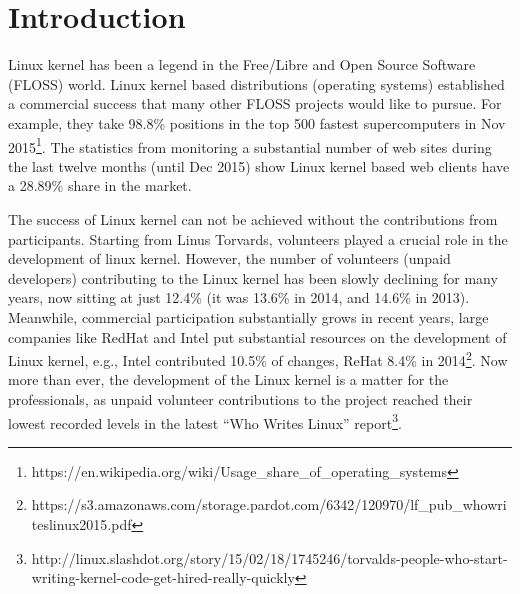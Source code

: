 \documentclass{sig-alternate-05-2015}
\begin{document}
\section{Introduction}

% 

Linux kernel has been a legend in the Free/Libre and Open Source Software (FLOSS) world.
Linux kernel based distributions (operating systems) established a commercial success
that many other FLOSS projects would like to pursue.
For example, they take 98.8\% positions in the top 500 fastest supercomputers 
in Nov 2015\footnote{https://en.wikipedia.org/wiki/Usage\_share\_of\_operating\_systems}.
The statistics from monitoring a substantial number of web sites during the 
last twelve months (until Dec 2015) show Linux kernel based
web clients have a 28.89\% share in the market.

The success of Linux kernel can not be achieved without the contributions
from participants. Starting from Linus Torvards,  volunteers
played a crucial role in the development of linux kernel. 
However, the number of volunteers (unpaid developers) contributing to the 
Linux kernel has been slowly declining for many years, now sitting at just 
 12.4\% (it was 13.6\% in 2014, and 14.6\% in 2013).
Meanwhile, commercial participation substantially grows in recent years,
large companies like RedHat and Intel put substantial resources on the development
of Linux kernel, e.g., Intel contributed 10.5\% of changes, ReHat 8.4\% 
in 2014\footnote{https://s3.amazonaws.com/storage.pardot.com/6342/120970/lf\_pub\_whowriteslinux2015.pdf}.
Now more than ever, the development of the Linux kernel is a matter for 
the professionals, as unpaid volunteer contributions to the project reached their 
lowest recorded levels in the latest ``Who Writes Linux''
report\footnote{http://linux.slashdot.org/story/15/02/18/1745246/torvalds-people-who-start-writing-kernel-code-get-hired-really-quickly}.

\end{document}
